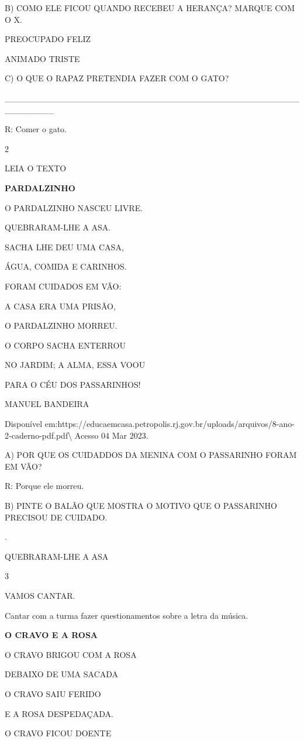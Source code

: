 {{{{{{B) COMO ELE FICOU QUANDO RECEBEU A HERANÇA? MARQUE COM O X.

PREOCUPADO FELIZ

ANIMADO TRISTE

C) O QUE O RAPAZ PRETENDIA FAZER COM O GATO?

\_\_\_\_\_\_\_\_\_\_\_\_\_\_\_\_\_\_\_\_\_\_\_\_\_\_\_\_\_\_\_\_\_\_\_\_\_\_\_\_\_\_\_\_\_\_\_\_\_\_\_\_\_\_\_\_

R: Comer o gato.

\num{2}

LEIA O TEXTO

\textbf{PARDALZINHO}

O PARDALZINHO NASCEU LIVRE.

\protect\hypertarget{_Hlk128840862}{}{}QUEBRARAM-LHE A ASA.

SACHA LHE DEU UMA CASA,

ÁGUA, COMIDA E CARINHOS.

FORAM CUIDADOS EM VÃO:

A CASA ERA UMA PRISÃO,

O PARDALZINHO MORREU.

O CORPO SACHA ENTERROU

NO JARDIM; A ALMA, ESSA \protect\hypertarget{_Hlk128858343}{}{}VOOU

PARA O CÉU DOS PASSARINHOS!

MANUEL BANDEIRA

Disponível
em:https://educaemcasa.petropolis.rj.gov.br/uploads/arquivos/8-ano-2-caderno-pdf.pdf\textbackslash{}
Acesso 04 Mar 2023.

A) POR QUE OS CUIDADDOS DA MENINA COM O PASSARINHO FORAM EM VÃO?

R: Porque ele morreu.

B) PINTE O BALÃO QUE MOSTRA O MOTIVO QUE O PASSARINHO PRECISOU DE
CUIDADO.

.

QUEBRARAM-LHE A ASA

\num{3}

VAMOS CANTAR.

Cantar com a turma fazer questionamentos sobre a letra da música.

\textbf{O CRAVO E A ROSA}

O CRAVO BRIGOU COM A ROSA

DEBAIXO DE UMA SACADA

O CRAVO SAIU FERIDO

E A ROSA DESPEDAÇADA.

\protect\hypertarget{_Hlk128859393}{}{}O CRAVO FICOU DOENTE

}}}}}}
